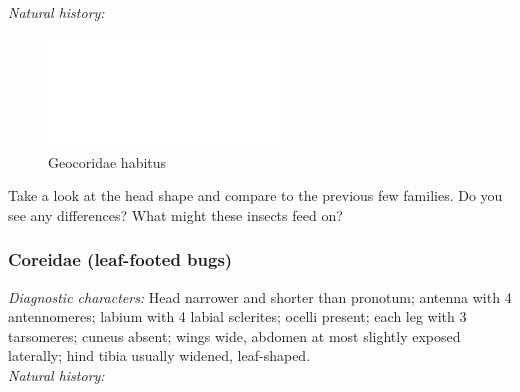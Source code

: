 \documentclass[letterpaper, 11pt]{article}
\begin{document}
\noindent{}\textit{Natural history:} \\

\begin{figure}[ht!]
 \centering
 \includegraphics[width=0.55\textwidth]{image14}
 \caption{Geocoridae habitus}
 \label{fig:geocorid1}
\end{figure}

\noindent{}Take a look at the head shape and compare to the previous few families. Do you see any differences? What might these insects feed on?\vspace{3cm}

\subsubsection{Coreidae (leaf-footed bugs)}
\noindent{}\textit{Diagnostic characters:} Head narrower and shorter than pronotum; antenna with 4 antennomeres; labium with 4 labial sclerites; ocelli present; each leg with 3 tarsomeres; cuneus absent; wings wide, abdomen at most slightly exposed laterally; hind tibia usually widened, leaf-shaped.\\

\noindent{}\textit{Natural history:} \\
\end{document}
